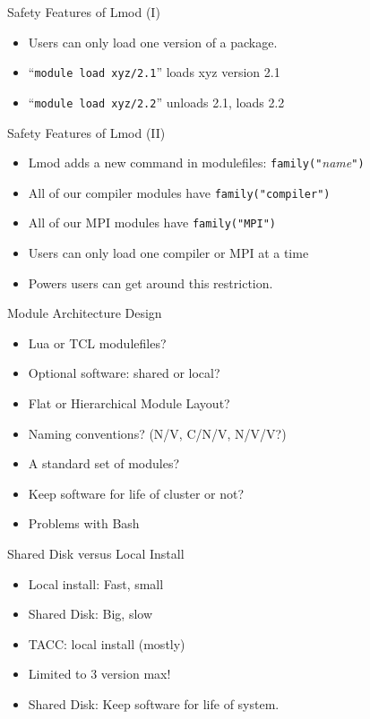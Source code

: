 \documentclass[dvipsnames,aspectratio=169]{beamer}
\begin{document}
\begin{frame}{Safety Features of Lmod (I)}
  \begin{itemize}
    \item Users can only load one version of a package.
    \item ``\texttt{module load xyz/2.1}'' loads xyz version 2.1
    \item ``\texttt{module load xyz/2.2}'' unloads 2.1, loads 2.2
  \end{itemize}
\end{frame}

\begin{frame}{Safety Features of Lmod (II)}
  \begin{itemize}
    \item Lmod adds a new command in modulefiles: \texttt{family("}\emph{name}\texttt{")}
    \item All of our compiler modules have \texttt{family("compiler")}
    \item All of our MPI modules have \texttt{family("MPI")}
    \item Users can only load one compiler or MPI at a time
    \item Powers users can get around this restriction.
  \end{itemize}
\end{frame}

\begin{frame}{Module Architecture Design}
  \begin{itemize}
    \item Lua or TCL modulefiles?
    \item Optional software: shared or local?
    \item Flat or Hierarchical Module Layout?
    \item Naming conventions? (N/V, C/N/V, N/V/V?)
    \item A standard set of modules?
    \item Keep software for life of cluster or not?
    \item Problems with Bash
  \end{itemize}
\end{frame}

\begin{frame}{Shared Disk versus Local Install}
  \begin{itemize}
    \item Local install: Fast, small 
    \item Shared Disk: Big, slow
    \item TACC: local install (mostly)
    \item Limited to 3 version max!
    \item Shared Disk: Keep software for life of system.
  \end{itemize}
\end{frame}
\end{document}
